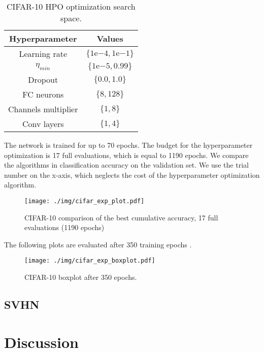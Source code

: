 \begin{table}[H]
    \centering
    \begin{tabular}{cc}
        \textbf{Hyperparameter} & \textbf{Values} \\ \midrule
        Learning rate & $\{1\mathrm{e}{-4}, 1\mathrm{e}{-1}\}$ \\
        $\eta_{min}$ & $\{1\mathrm{e}{-5}, 0.99\}$ \\
        Dropout & $\{0.0, 1.0\}$ \\
        FC neurons & $\{8, 128\}$ \\
        Channels multiplier & $\{1, 8\}$ \\
        Conv layers & $\{1, 4\}$ \\
    \end{tabular}
    \caption{CIFAR-10 HPO optimization search space.}
    \label{tc10}
\end{table}

The network is trained for up to 70 epochs. The budget for the hyperparameter optimization is 17 full evaluations, which is equal to 1190 epochs. We compare the algorithms in classification accuracy on the validation set. We use the trial number on the x-axis, which neglects the cost of the hyperparameter optimization algorithm.

\begin{figure}[H]
    \centering
    \texttt{[image: ./img/cifar\_exp\_plot.pdf]}
    \caption{CIFAR-10 comparison of the best cumulative accuracy, 17 full evaluations (1190 epochs)}
\end{figure}

The following plots are evaluated after 350 training epochs .

\begin{figure}[H]
    \centering
    \texttt{[image: ./img/cifar\_exp\_boxplot.pdf]}
    \caption{CIFAR-10 boxplot after 350 epochs.}
\end{figure}


\subsection{SVHN}

\section{Discussion}
